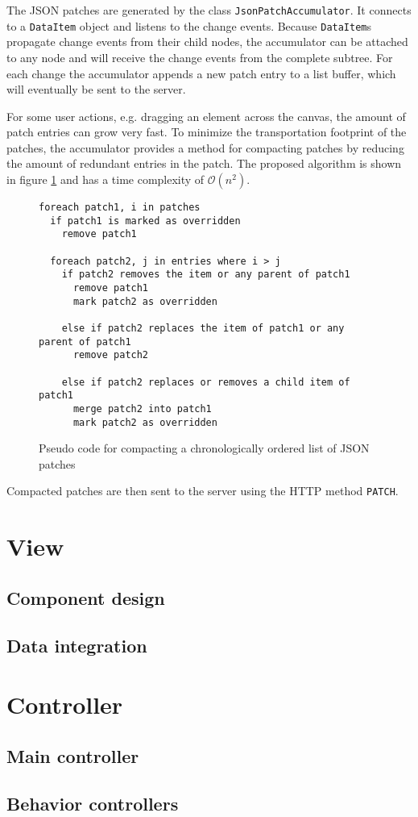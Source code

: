The JSON patches are generated by the class \texttt{JsonPatchAccumulator}. It connects to a \texttt{DataItem} object and listens to the change events. Because \texttt{DataItem}s propagate change events from their child nodes, the accumulator can be attached to any node and will receive the change events from the complete subtree. For each change the accumulator appends a new patch entry to a list buffer, which will eventually be sent to the server.

For some user actions, e.g. dragging an element across the canvas, the amount of patch entries can grow very fast. To minimize the transportation footprint of the patches, the accumulator provides a method for compacting patches by reducing the amount of redundant entries in the patch. The proposed algorithm is shown in figure \ref{fig:patchcompact} and has a time complexity of $\mathcal O(n^2)$. 

\begin{figure}
\begin{lstlisting}[language=pseudo]
foreach patch1, i in patches
  if patch1 is marked as overridden
    remove patch1
  
  foreach patch2, j in entries where i > j
    if patch2 removes the item or any parent of patch1
      remove patch1
      mark patch2 as overridden
      
    else if patch2 replaces the item of patch1 or any parent of patch1
      remove patch2
     
    else if patch2 replaces or removes a child item of patch1
      merge patch2 into patch1
      mark patch2 as overridden    
\end{lstlisting}
\caption{Pseudo code for compacting a chronologically ordered list of JSON patches}
\label{fig:patchcompact}
\end{figure}

Compacted patches are then sent to the server using the HTTP method \texttt{PATCH}.


\section{View}

\subsection{Component design}

\subsection{Data integration}


\section{Controller}

\subsection{Main controller}

\subsection{Behavior controllers}

